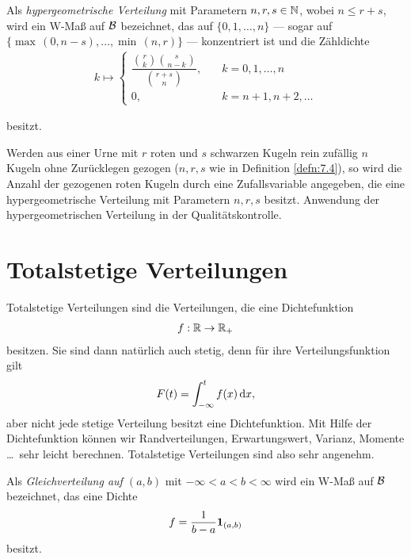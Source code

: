 \begin{defn}
\label{defn:7.4}
Als \emph{hypergeometrische Verteilung} mit Parametern 
$n,r, s\in \mathbb{N}$, wobei $n\leq r+s$, wird ein W-Maß auf ${\mathcal{B}}$
bezeichnet, das auf $\{0,1,\ldots,n\}$ --- sogar auf $\{\max \,(0,n-s),\ldots
,\min\, (n,r)\}$
--- konzentriert ist und die Zähldichte
\begin{align*}
k\mapsto
\begin{cases}
{\dfrac{{r\choose k} {s\choose n-k}}{{r+s\choose n}} }, & \quad
k=0,1,\ldots,n\\[2mm]
0, & \quad k=n+1, n+2,\ldots
\end{cases}
\end{align*}

besitzt.\fishhere
\end{defn}

\begin{bem}
\label{bem:7.4}
Werden aus einer Urne mit $r$ roten und $s$ schwarzen
Kugeln rein zufällig $n$ Kugeln ohne Zurücklegen gezogen ($n,r,s$ wie in
Definition \ref{defn:7.4}), so wird die Anzahl der gezogenen roten Kugeln durch
eine Zufallsvariable angegeben, die eine hypergeometrische Verteilung mit
Parametern $n,r,s $ besitzt. Anwendung der hypergeometrischen Verteilung in der
Qualitätskontrolle.\maphere
\end{bem}

\clearpage

\section{Totalstetige Verteilungen}

Totalstetige Verteilungen sind die Verteilungen, die eine Dichtefunktion
\begin{align*}
f: \mathbb{R} \to \mathbb{R}_+
\end{align*}
besitzen. Sie sind dann natürlich auch stetig, denn für ihre
Verteilungsfunktion gilt
\begin{align*}
F(t) = \int_{-\infty}^t f(x)\,\mathrm{d} x,
\end{align*}
aber nicht jede stetige Verteilung besitzt eine Dichtefunktion. Mit Hilfe der
Dichtefunktion können wir Randverteilungen, Erwartungswert, Varianz, Momente
\ldots\ sehr leicht berechnen. Totalstetige Verteilungen sind also
sehr angenehm.

\begin{defn}
\label{defn:7.5}
Als \emph{Gleichverteilung auf $ (a,b)$} mit $-\infty < a < b < \infty $
wird ein W-Maß auf ${\mathcal{B}}$ bezeichnet, das eine Dichte
\begin{align*}
f=\frac{1}{b-a}\mathbf{1}_{(a,b)}
\end{align*}
besitzt.\fishhere
\end{defn}


